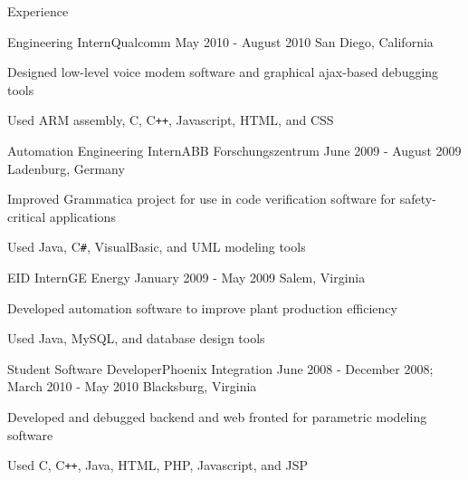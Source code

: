 \documentclass{resume}
\begin{document}
\begin{section}{Experience}
		\begin{experience}{Engineering Intern}{Qualcomm}
		                  {May 2010 - August 2010}
		                  {San Diego, California}
			\item Designed low-level voice modem software and graphical ajax-based
			      debugging tools
			\item Used ARM assembly, C, C\texttt{++}, Javascript, HTML, and CSS
		\end{experience}

		\begin{experience}{Automation Engineering Intern}{ABB Forschungszentrum}
		                  {June 2009 - August 2009}
		                  {Ladenburg, Germany}
			\item Improved Grammatica project for use in code verification software
			      for safety-critical applications
			\item Used Java, C\texttt{\#}, VisualBasic, and UML modeling tools
		\end{experience}

		\begin{experience}{EID Intern}{GE Energy}
		                  {January 2009 - May 2009}
		                  {Salem, Virginia}
			\item Developed automation software to improve plant production
			      efficiency
			\item Used Java, MySQL, and database design tools
		\end{experience}

		\begin{experience}{Student Software Developer}{Phoenix Integration}
		                  {June 2008 - December 2008; March 2010 - May 2010}
		                  {Blacksburg, Virginia}
			\item Developed and debugged backend and web fronted for parametric
			      modeling software
			\item Used C, C\texttt{++}, Java, HTML, PHP, Javascript, and JSP
		\end{experience}
	\end{section}
\end{document}
